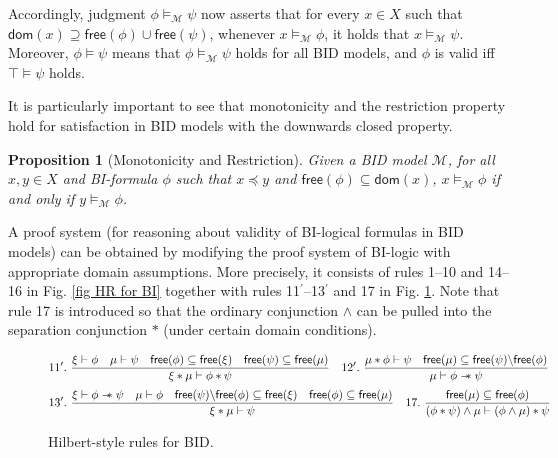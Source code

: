 \documentclass[conference,compsoc, 10pt]{IEEEtran}
\newtheorem{definition}{Definition}[section]
\newtheorem{proposition}{Proposition}[section]
\newcommand {\cM } {{\mathcal{M}}}
\newcommand {\LTypeE }[1] {{\mathsf{dom}\!\left(#1\right)}}
\newcommand {\LTypeF }[1] {{\mathsf{free}{\left(#1\right)}}}
\newcommand {\sepimp} {\mathrel{-\mkern-6mu*}}
\newcommand{\sd}{\diamond}%
\newcommand {\sdimp} {\mathrel{-\mkern-2.5mu\diamond}}
\newcommand{\qm}{{\ ?\ }}%
\newcommand {\qmimp} {\mathrel{-\mkern-6mu?}}
\begin{document}
\begin{appendices}
		Accordingly, judgment $\phi\models_\cM\psi$ now asserts that for every $x\in X$ such that $\LTypeE{x}\supseteq \LTypeF{\phi}\cup\LTypeF{\psi}$, whenever $x\models_\cM \phi$, it holds that $x\models_\cM \psi$. Moreover, $\phi\models\psi$ means that $\phi\models_\cM\psi$ holds for all BID models, and  $\phi$ is valid iff $\top\models\psi$ holds.
		
		It is particularly important to see that monotonicity and the restriction property hold for satisfaction in BID models with the downwards closed   property.
		
		\begin{proposition}[Monotonicity and Restriction]
			\label{prop BI mon and res}
			Given a BID model $\cM$, 
			for all $x,y\in X$ and BI-formula $\phi$ such that $x\preceq y$ and $\LTypeF{\phi}\subseteq\LTypeE{x}$, 
			$x\models_\cM \phi$ if and only if $y\models_\cM \phi$.
		\end{proposition}
		
		A proof system (for reasoning about validity of BI-logical formulas in BID models) can be obtained by modifying the proof system of BI-logic with appropriate domain assumptions. More precisely, it consists of rules 1--10 and 14--16 in Fig. \ref{fig HR for BI} together with rules 11$^\prime$--13$^\prime$ and 17 in Fig. \ref{fig HR for BID}. Note that rule 17 is introduced so that the ordinary conjunction $\wedge$ can be pulled into the separation conjunction $\ast$ (under certain domain conditions).
		\begin{figure}
			\small
			\begin{align*}
			&11^\prime. \ \frac{\xi\vdash\phi\quad\mu\vdash\psi\quad \LTypeF{\phi}\subseteq\LTypeF{\xi}\quad\LTypeF{\psi}\subseteq\LTypeF{\mu}}{\xi\ast\mu\vdash\phi\ast\psi} \quad
			12^\prime. \  \frac{\mu\ast\phi\vdash\psi\quad \LTypeF{\mu}\subseteq\LTypeF{\psi}\backslash\LTypeF{\phi}}{\mu\vdash\phi\sepimp\psi} \\[0.1cm]
			&13^\prime. \  \frac{\xi\vdash\phi\sepimp\psi\quad\mu\vdash\phi \quad \LTypeF{\psi}\backslash\LTypeF{\phi}\subseteq\LTypeF{\xi}\quad \LTypeF{\phi}\subseteq\LTypeF{\mu} }{\xi\ast\mu\vdash\psi} \quad
			17. \  \frac{\LTypeF{\mu}\subseteq\LTypeF{\phi}}{(\phi\ast\psi)\wedge\mu\vdash(\phi\wedge\mu)\ast\psi}
			\end{align*}
			\caption{Hilbert-style rules for BID. 
			}
			\label{fig HR for BID}
		\end{figure}
		

\end{appendices}
\end{document}

